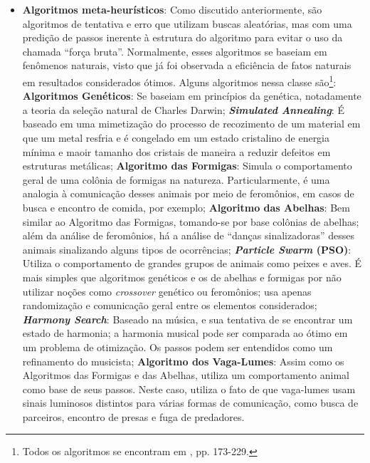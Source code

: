\begin{itemize}
\item \textbf{Algoritmos meta-heur\'{i}sticos}: Como discutido anteriormente, s\~{a}o algoritmos de tentativa e erro que utilizam buscas aleat\'{o}rias, mas com uma predi\c{c}\~{a}o de passos inerente \`{a} estrutura do algoritmo para evitar o uso da chamada ``for\c{c}a bruta''. Normalmente, esses algoritmos se baseiam em fen\^{o}menos naturais, visto que j\'{a} foi observada a efici\^{e}ncia de fatos naturais em resultados considerados \'{o}timos. Alguns algoritmos nessa classe s\~{a}o\footnote{Todos os algoritmos se encontram em \cite{yang}, pp. 173-229.}:
\subitem \textbf{Algoritmos Gen\'{e}ticos}: Se baseiam em princ\'{i}pios da gen\'{e}tica, notadamente a teoria da sele\c{c}\~{a}o natural de Charles Darwin;
\subitem \textbf{\textit{Simulated Annealing}}: \'{E} baseado em uma mimetiza\c{c}\~{a}o do processo de recozimento de um material em que um metal resfria e \'{e} congelado em um estado cristalino de energia m\'{i}nima e maoir tamanho dos cristais de maneira a reduzir defeitos em estruturas met\'{a}licas;
\subitem \textbf{Algoritmo das Formigas}: Simula o comportamento geral de uma col\^{o}nia de formigas na natureza. Particularmente, \'{e} uma analogia \`{a} comunica\c{c}\~{a}o desses animais por meio de ferom\^{o}nios, em casos de busca e encontro de comida, por exemplo;
\subitem \textbf{Algoritmo das Abelhas}: Bem similar ao Algoritmo das Formigas, tomando-se por base col\^{o}nias de abelhas; al\'{e}m da an\'{a}lise de ferom\^{o}nios, h\'{a} a an\'{a}lise de ``dan\c{c}as sinalizadoras'' desses animais sinalizando alguns tipos de ocorr\^{e}ncias;
\subitem \textbf{\textit{Particle Swarm} (PSO)}: Utiliza o comportamento de grandes grupos de animais como peixes e aves. \'{E} mais simples que algoritmos gen\'{e}ticos e os de abelhas e formigas por n\~{a}o utilizar no\c{c}\~{o}es como \textit{crossover} gen\'{e}tico ou ferom\^{o}nios; usa apenas randomiza\c{c}\~{a}o e comunica\c{c}\~{a}o geral entre os elementos considerados;
\subitem \textbf{\textit{Harmony Search}}: Baseado na m\'{u}sica, e sua tentativa de se encontrar um estado de harmonia; a harmonia musical pode ser comparada ao \'{o}timo em um problema de otimiza\c{c}\~{a}o. Os passos podem ser entendidos como um refinamento do musicista;
\subitem \textbf{Algoritmo dos Vaga-Lumes}: Assim como os Algoritmos das Formigas e das Abelhas, utiliza um comportamento animal como base de seus passos. Neste caso, utiliza o fato de que vaga-lumes usam sinais luminosos distintos para v\'{a}rias formas de comunica\c{c}\~{a}o, como busca de parceiros, encontro de presas e fuga de predadores.

\end{itemize}

